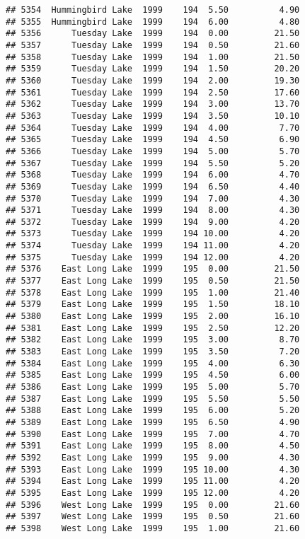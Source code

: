 \documentclass[
]{article}
\begin{document}
\begin{verbatim}
## 5354  Hummingbird Lake  1999    194  5.50          4.90
## 5355  Hummingbird Lake  1999    194  6.00          4.80
## 5356      Tuesday Lake  1999    194  0.00         21.50
## 5357      Tuesday Lake  1999    194  0.50         21.60
## 5358      Tuesday Lake  1999    194  1.00         21.50
## 5359      Tuesday Lake  1999    194  1.50         20.20
## 5360      Tuesday Lake  1999    194  2.00         19.30
## 5361      Tuesday Lake  1999    194  2.50         17.60
## 5362      Tuesday Lake  1999    194  3.00         13.70
## 5363      Tuesday Lake  1999    194  3.50         10.10
## 5364      Tuesday Lake  1999    194  4.00          7.70
## 5365      Tuesday Lake  1999    194  4.50          6.90
## 5366      Tuesday Lake  1999    194  5.00          5.70
## 5367      Tuesday Lake  1999    194  5.50          5.20
## 5368      Tuesday Lake  1999    194  6.00          4.70
## 5369      Tuesday Lake  1999    194  6.50          4.40
## 5370      Tuesday Lake  1999    194  7.00          4.30
## 5371      Tuesday Lake  1999    194  8.00          4.30
## 5372      Tuesday Lake  1999    194  9.00          4.20
## 5373      Tuesday Lake  1999    194 10.00          4.20
## 5374      Tuesday Lake  1999    194 11.00          4.20
## 5375      Tuesday Lake  1999    194 12.00          4.20
## 5376    East Long Lake  1999    195  0.00         21.50
## 5377    East Long Lake  1999    195  0.50         21.50
## 5378    East Long Lake  1999    195  1.00         21.40
## 5379    East Long Lake  1999    195  1.50         18.10
## 5380    East Long Lake  1999    195  2.00         16.10
## 5381    East Long Lake  1999    195  2.50         12.20
## 5382    East Long Lake  1999    195  3.00          8.70
## 5383    East Long Lake  1999    195  3.50          7.20
## 5384    East Long Lake  1999    195  4.00          6.30
## 5385    East Long Lake  1999    195  4.50          6.00
## 5386    East Long Lake  1999    195  5.00          5.70
## 5387    East Long Lake  1999    195  5.50          5.50
## 5388    East Long Lake  1999    195  6.00          5.20
## 5389    East Long Lake  1999    195  6.50          4.90
## 5390    East Long Lake  1999    195  7.00          4.70
## 5391    East Long Lake  1999    195  8.00          4.50
## 5392    East Long Lake  1999    195  9.00          4.30
## 5393    East Long Lake  1999    195 10.00          4.30
## 5394    East Long Lake  1999    195 11.00          4.20
## 5395    East Long Lake  1999    195 12.00          4.20
## 5396    West Long Lake  1999    195  0.00         21.60
## 5397    West Long Lake  1999    195  0.50         21.60
## 5398    West Long Lake  1999    195  1.00         21.60

\end{verbatim}
\end{document}
